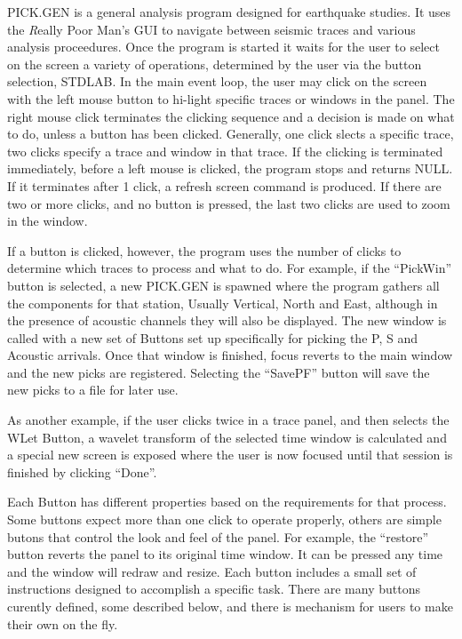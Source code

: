 \documentclass{article}
\begin{document}
PICK.GEN is a general analysis program designed for earthquake studies.
It uses the {\emph Really Poor Man's GUI} to 
navigate between seismic traces and 
various analysis proceedures.
Once the program is started it waits for the user to
select on the screen a variety of operations, determined
by the user via the button selection, STDLAB.
In the main event loop, 
the user may click on the screen with the left mouse 
button to hi-light specific traces or windows in the panel.
The right mouse click terminates the clicking sequence and
a decision is made on what to do, unless a button has been clicked.
Generally, one click slects a specific trace,
two clicks specify a trace and window in that trace.
If the clicking is terminated immediately, 
before a left mouse is clicked, the program stops and returns
NULL.
If it terminates after 1 click, a refresh screen 
command is produced. If there are two or more clicks,
and no button is pressed, the last two clicks are
used to zoom in the window.

If a button is clicked, however, 
the program
uses the number of clicks to determine
which traces to process and what to do.
For example, if the ``PickWin'' button is selected,
a new PICK.GEN is spawned where the program 
gathers all the components for that station, Usually Vertical, North and East,
although in the presence of acoustic channels they will also be displayed.
The new window is called with a new set of Buttons
set up specifically for picking the P, S and Acoustic arrivals.
Once that window is finished, focus reverts to the main 
window and the new picks are registered.
Selecting the ``SavePF'' button will save the
new picks to a file for later use.

As another example, if the user clicks twice in a trace panel,
and then selects the WLet Button, a wavelet transform
of the selected time window is calculated and 
a special new screen is exposed where the 
user is now focused until that session is finished by
clicking ``Done''.

Each Button has different properties based on the 
requirements for that process.  Some buttons 
expect more than one click to operate properly, others 
are simple butons that control the look and feel of the 
panel. For example, the ``restore'' button
reverts the panel to its original time window.
It can be pressed any time and the 
window will redraw and resize.
Each button includes a small set of instructions
designed to accomplish a specific task.
There are many buttons curently defined, some described below, and 
there is mechanism for users to  make their own
on the fly.
\end{document}
